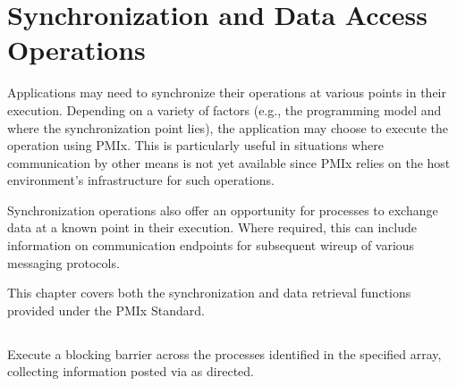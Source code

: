 \chapter{Synchronization and Data Access Operations}
\label{chap:api_sync_acc}

Applications may need to synchronize their operations at various points in
their execution. Depending on a variety of factors (e.g., the programming
model and where the synchronization point lies), the application may choose to
execute the operation using \ac{PMIx}. This is particularly useful in
situations where communication by other means is not yet available since
\ac{PMIx} relies on the host environment's infrastructure for such operations.

Synchronization operations also offer an opportunity for processes to exchange
data at a known point in their execution. Where required, this can include
information on communication endpoints for subsequent wireup of various
messaging protocols.

This chapter covers both the synchronization and data retrieval functions
provided under the \ac{PMIx} Standard.

\section{}

\summary

Execute a blocking barrier across the processes identified in the specified array, collecting information posted via  as directed.

\format


\begin{arglist}
\end{arglist}

